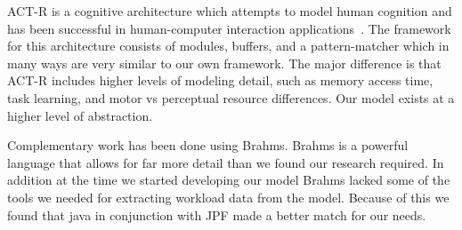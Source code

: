 ACT-R is a cognitive architecture which attempts to model human cognition and
has been successful in human-computer interaction applications~\cite{anderson2004integrated,lebiere2013cognitive}.  The
framework for this architecture consists of modules, buffers, and a pattern-matcher which in many ways are very similar to our own framework.  The major
difference is that ACT-R includes higher levels of modeling detail, such as memory access
time, task learning, and motor vs perceptual resource differences.  Our model exists at a higher level of abstraction.

Complementary work has been done using Brahms. Brahms is a powerful language that allows for far more detail than we found our research required. In addition at the time we started developing our model Brahms lacked some of the tools we needed for extracting workload data from the model. Because of this we found that java in conjunction with JPF made a better match for our needs.